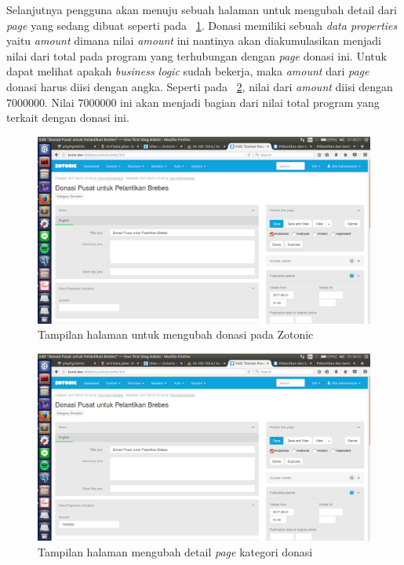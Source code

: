 Selanjutnya pengguna akan menuju sebuah halaman untuk mengubah detail dari \textit{page} yang sedang dibuat seperti pada \pic~\ref{fig:editdonation}. Donasi memiliki sebuah \textit{data properties} yaitu \textit{amount} dimana nilai \textit{amount} ini nantinya akan diakumulasikan menjadi nilai dari total pada program yang terhubungan dengan \textit{page} donasi ini. Untuk dapat melihat apakah \textit{business logic} sudah bekerja, maka \textit{amount} dari \textit{page} donasi harus diisi dengan angka. Seperti pada \pic~\ref{fig:editdonation2}, nilai dari \textit{amount} diisi dengan 7000000. Nilai 7000000 ini akan menjadi bagian dari nilai total program yang terkait dengan donasi ini.
\begin{figure}
	\centering
	\includegraphics[width=1\textwidth]
	{pics/7-editDonation.png}
	\caption{Tampilan halaman untuk mengubah donasi pada Zotonic}
	\label{fig:editdonation}
\end{figure}
\vspace{-0.3cm}

\begin{figure}
	\centering
	\includegraphics[width=1\textwidth]
	{pics/8-editDonation2.png}
	\caption{Tampilan halaman mengubah detail \textit{page} kategori donasi}
	\label{fig:editdonation2}
\end{figure}
\vspace{-0.3cm}

